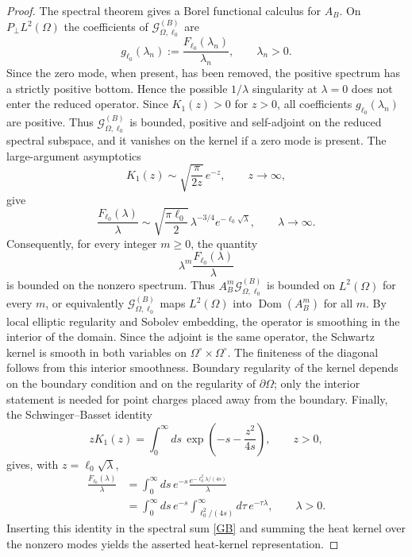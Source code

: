 \documentclass[openacc]{rsproca_new}%
\begin{document}
\begin{proof}
The spectral theorem gives a Borel functional calculus for $A_B$. On $P_\perp L^2(\Omega)$ the coefficients of $\mathcal G_{\Omega,\ell_0}^{(B)}$ are
\begin{equation}
  g_{\ell_0}(\lambda_n)
  :=\frac{F_{\ell_0}(\lambda_n)}{\lambda_n},
  \qquad \lambda_n>0.
\end{equation}
Since the zero mode, when present, has been removed, the positive spectrum has a strictly positive bottom. Hence the possible $1/\lambda$ singularity at $\lambda=0$ does not enter the reduced operator. Since $K_1(z)>0$ for $z>0$, all coefficients $g_{\ell_0}(\lambda_n)$ are positive. Thus $\mathcal G_{\Omega,\ell_0}^{(B)}$ is bounded, positive and self-adjoint on the reduced spectral subspace, and it vanishes on the kernel if a zero mode is present. The large-argument asymptotics \cite{Abramowitz1972}
\begin{equation}
  K_1(z)\sim\sqrt{\frac{\pi}{2z}}\,e^{-z},
  \qquad z\to\infty,
\end{equation}
give
\begin{equation}
  \frac{F_{\ell_0}(\lambda)}{\lambda}
  \sim
  \sqrt{\frac{\pi\ell_0}{2}}\,\lambda^{-3/4}e^{-\ell_0\sqrt{\lambda}},
  \qquad \lambda\to\infty.
\end{equation}
Consequently, for every integer $m\geq0$, the quantity
\begin{equation}
  \lambda^m\frac{F_{\ell_0}(\lambda)}{\lambda}
\end{equation}
is bounded on the nonzero spectrum. Thus $A_B^m\mathcal G_{\Omega,\ell_0}^{(B)}$ is bounded on $L^2(\Omega)$ for every $m$, or equivalently $\mathcal G_{\Omega,\ell_0}^{(B)}$ maps $L^2(\Omega)$ into $\operatorname{Dom}(A_B^m)$ for all $m$. By local elliptic regularity and Sobolev embedding, the operator is smoothing in the interior of the domain. Since the adjoint is the same operator, the Schwartz kernel is smooth in both variables on $\Omega^\circ\times\Omega^\circ$. The finiteness of the diagonal follows from this interior smoothness. Boundary regularity of the kernel depends on the boundary condition and on the regularity of $\partial\Omega$; only the interior statement is needed for point charges placed away from the boundary. Finally, the Schwinger--Basset identity \cite{GradshteynRyzhik2014}
\begin{equation}
  zK_1(z)=\int_0^\infty ds\,\exp\!\left(-s-\frac{z^2}{4s}\right),
  \qquad z>0,
\end{equation}
gives, with $z=\ell_0\sqrt{\lambda}$,
\begin{align}
  \frac{F_{\ell_0}(\lambda)}{\lambda}
  &=\int_0^\infty ds\,e^{-s}
  \frac{e^{-\ell_0^2\lambda/(4s)}}{\lambda}
  \nonumber\\
  &=\int_0^\infty ds\,e^{-s}
  \int_{\ell_0^2/(4s)}^\infty d\tau\,e^{-\tau\lambda},
  \qquad \lambda>0.
\end{align}
Inserting this identity in the spectral sum \eqref{GB} and summing the heat kernel over the nonzero modes yields the asserted heat-kernel representation.
\end{proof}
\end{document}
